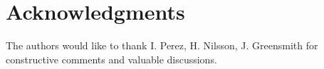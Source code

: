 \section*{Acknowledgments}
The authors would like to thank I. Perez, H. Nilsson, J. Greensmith for constructive comments and valuable discussions.